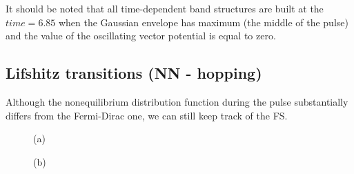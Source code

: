 It should be noted that all time-dependent band structures are built at the $time=6.85$ when the Gaussian envelope has maximum (the middle of the pulse) and the value of the oscillating vector potential is equal to zero.

\FloatBarrier


\subsection{Lifshitz transitions (NN - hopping)}

Although the nonequilibrium distribution function during the pulse substantially differs from the Fermi-Dirac one, 
we can still keep track of the FS. 
\begin{figure}[h!]
\begin{minipage}[h]{0.5\linewidth}
 (a) \\
\end{minipage}
\hfill
\begin{minipage}[h]{0.5\linewidth}
 (b) \\

\end{minipage}
\end{figure}
